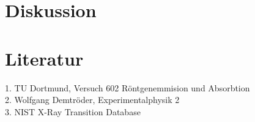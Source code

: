 \section{Diskussion}
\label{sec:diskussion}
\section{Literatur}
\label{sec:literatur}
1. TU Dortmund, Versuch 602 Röntgenemmision und Absorbtion\\
2. Wolfgang Demtröder, Experimentalphysik 2\\
3. NIST X-Ray Transition Database 